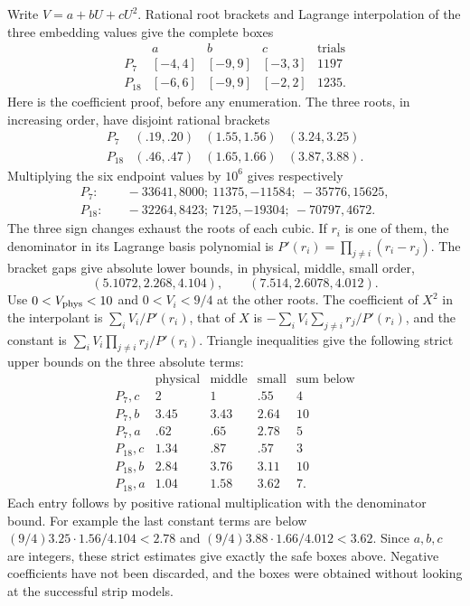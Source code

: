 \documentclass[11pt]{article}
\begin{document}
Write $V=a+bU+cU^2$. Rational root brackets and Lagrange
interpolation of the three embedding values give the complete boxes
\[
 \begin{array}{c|ccc|r}
 &a&b&c&\text{trials}\\\hline
 P_7&[-4,4]&[-9,9]&[-3,3]&1197\\
 P_{18}&[-6,6]&[-9,9]&[-2,2]&1235.
 \end{array}
\]
Here is the coefficient proof, before any enumeration. The three
roots, in increasing order, have disjoint rational brackets
\[
 \begin{array}{c|ccc}
 P_7&(.19,.20)&(1.55,1.56)&(3.24,3.25)\\
 P_{18}&(.46,.47)&(1.65,1.66)&(3.87,3.88).
 \end{array}
\]
Multiplying the six endpoint values by $10^6$ gives respectively
\[
\begin{split}
P_7:&\quad-33641,8000;\ 11375,-11584;\ -35776,15625,\\
P_{18}:&\quad-32264,8423;\ 7125,-19304;\ -70797,4672.
\end{split}
\]
The three sign changes exhaust the roots of each cubic. If $r_i$ is
one of them, the denominator in its Lagrange basis polynomial is
$P'(r_i)=\prod_{j\ne i}(r_i-r_j)$. The bracket gaps give absolute
lower bounds, in physical, middle, small order,
\[
 (5.1072,2.268,4.104),\qquad(7.514,2.6078,4.012).
\]
Use $0<V_{\rm phys}<10$ and $0<V_i<9/4$ at the other roots.
The coefficient of $X^2$ in the interpolant is
$\sum_iV_i/P'(r_i)$, that of $X$ is
$-\sum_iV_i\sum_{j\ne i}r_j/P'(r_i)$, and the constant is
$\sum_iV_i\prod_{j\ne i}r_j/P'(r_i)$. Triangle inequalities give
the following strict upper bounds on the three absolute terms:
\[
\begin{array}{c|ccc|c}
 &\text{physical}&\text{middle}&\text{small}&\text{sum below}\\\hline
P_7,c&2&1&.55&4\\
P_7,b&3.45&3.43&2.64&10\\
P_7,a&.62&.65&2.78&5\\
P_{18},c&1.34&.87&.57&3\\
P_{18},b&2.84&3.76&3.11&10\\
P_{18},a&1.04&1.58&3.62&7.
\end{array}
\]
Each entry follows by positive rational multiplication with the
denominator bound. For example the last constant terms are below
$(9/4)3.25\cdot1.56/4.104<2.78$ and
$(9/4)3.88\cdot1.66/4.012<3.62$.
Since $a,b,c$ are integers, these strict estimates give exactly the
safe boxes above. Negative coefficients have not been discarded, and
the boxes were obtained without looking at the successful strip models.
\end{document}
